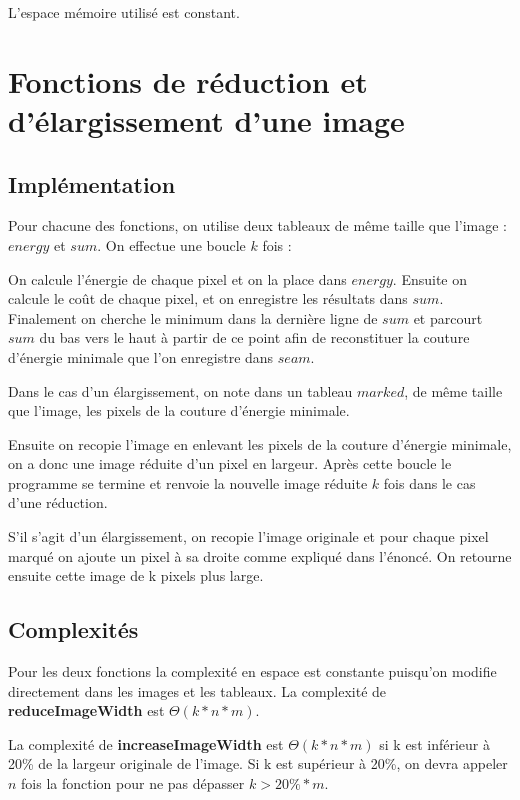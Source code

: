 L'espace mémoire utilisé est constant.

\section{Fonctions de réduction et d'élargissement d'une image} %
\subsection{Implémentation} %
Pour chacune des fonctions, on utilise deux tableaux de même taille que l'image : $energy$ et $sum$. 
On effectue une boucle $k$ fois :

On calcule l'énergie de chaque pixel et on la place dans $energy$.
Ensuite on calcule le coût de chaque pixel, et on enregistre les résultats dans $sum$.
Finalement on cherche le minimum dans la dernière ligne de $sum$ et parcourt $sum$ du bas vers le haut à partir de ce point afin de reconstituer la couture d'énergie minimale que l'on enregistre dans $seam$.

Dans le cas d'un élargissement, on note dans un tableau $marked$, de même taille que l'image, les pixels de la couture d'énergie minimale.

Ensuite on recopie l'image en enlevant les pixels de la couture d'énergie minimale, on a donc une image réduite d'un pixel en largeur.
\bigbreak
Après cette boucle le programme se termine et renvoie la nouvelle image réduite $k$ fois dans le cas d'une réduction. 

S'il s'agit d'un élargissement, on recopie l'image originale et pour chaque pixel marqué on ajoute un pixel à sa droite comme expliqué dans l'énoncé. On retourne ensuite cette image de k pixels plus large.
\subsection{Complexités} %
Pour les deux fonctions la complexité en espace est constante puisqu'on modifie directement dans les images et les tableaux.
La complexité de \textbf{reduceImageWidth} est $\Theta(k*n*m)$.

La complexité de \textbf{increaseImageWidth} est $\Theta(k*n*m)$ si k est inférieur à 20\% de la largeur originale de l'image. Si k est supérieur à 20\%, on devra appeler $n$ fois la fonction pour ne pas dépasser $k > 20\% * m$.

